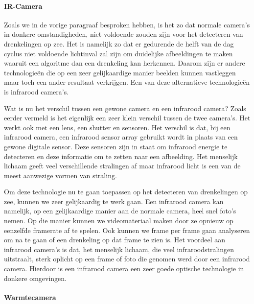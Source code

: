\paragraph{IR-Camera}

Zoals we in de vorige paragraaf besproken hebben, is het zo dat normale camera's in donkere omstandigheden, niet voldoende zouden zijn voor het detecteren van drenkelingen op zee. Het is namelijk zo dat er gedurende de helft van de dag cyclus niet voldoende lichtinval zal zijn om duidelijke afbeeldingen te maken waaruit een algoritme dan een drenkeling kan herkennen. Daarom zijn er andere technologieën die op een zeer gelijkaardige manier beelden kunnen vastleggen maar toch een ander resultaat verkrijgen. Een van deze alternatieve technologieën is infrarood camera's. 


Wat is nu het verschil tussen een gewone camera en een infrarood camera? Zoals eerder vermeld is het eigenlijk een zeer klein verschil tussen de twee camera's. Het werkt ook met een lens, een shutter en sensoren. Het verschil is dat, bij een infrarood camera, een infrarood sensor array gebruikt wordt in plaats van een gewone digitale sensor. Deze sensoren zijn in staat om infrarood energie te detecteren en deze informatie om te zetten naar een afbeelding. Het menselijk lichaam geeft veel verschillende stralingen af maar infrarood licht is een van de meest aanwezige vormen van straling.


Om deze technologie nu te gaan toepassen op het detecteren van drenkelingen op zee, kunnen we zeer gelijkaardig te werk gaan. Een infrarood camera kan namelijk, op een gelijkaardige manier aan de normale camera, heel snel foto's nemen. Op die manier kunnen we videomateriaal maken door ze opnieuw op eenzelfde framerate af te spelen. Ook kunnen we frame per frame gaan analyseren om na te gaan of een drenkeling op dat frame te zien is. Het voordeel aan infrarood camera's is dat, het menselijk lichaam, die veel infraroodstralingen uitstraalt, sterk oplicht op een frame of foto die genomen werd door een infrarood camera. Hierdoor is een infrarood camera een zeer goede optische technologie in donkere omgevingen. 

\paragraph{Warmtecamera}

